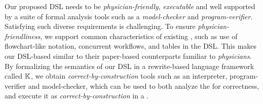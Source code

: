 %

%



\noindent Our proposed DSL needs to be \emph{physician-friendly}, \emph{executable}
and well supported by a suite of formal analysis tools such as a
\emph{model-checker} and \emph{program-verifier}. Satisfying such diverse
requirements is challenging. To ensure \emph{physician-friendliness}, we
support common characteristics of existing \BPGs{}, such as use of flowchart-like
notation, concurrent workflows, and tables in the DSL. This makes our DSL-based \BPGs{}
similar to their paper-based counterparts familiar to \emph{physicians}.
By formalizing the semantics of our DSL in a rewrite-based language framework
called $\mathbb{K}{}$, we obtain \emph{correct-by-construction} tools such as an
interpreter, program-verifier and model-checker, which can be used to both
analyze the \BPG{} for correctness, and execute it as \emph{correct-by-construction} \BPGLogic{} in a \CGS{}.

